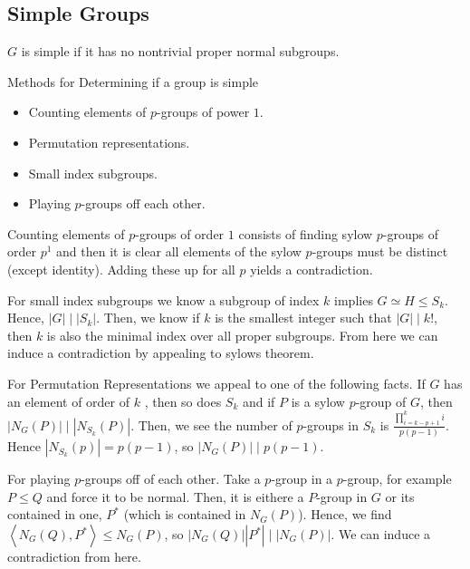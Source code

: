 \subsection{Simple Groups}
\begin{definition}
\(G\) is simple if it has no nontrivial proper normal subgroups.
\end{definition}
\begin{remark}
	Methods for Determining if a group is simple
	\begin{itemize}
		\item Counting elements of \(p\)-groups of power \(1\).
			\item Permutation representations.
				\item Small index subgroups.
					\item Playing \(p\)-groups off each other.
	\end{itemize}
\end{remark}
\begin{remark}
	Counting elements of \(p\)-groups of order \(1\) consists of finding sylow \(p\)-groups of order \(p^{1}\) and then it is clear all elements of the sylow \(p\)-groups must be distinct (except identity). Adding these up for all \(p\) yields a contradiction.
\end{remark}
\begin{remark}
	For small index subgroups we know a subgroup of index \(k\) implies \(G \simeq H \le S_{k}\). Hence, \(\left| G \right| \mid \left| S_{k} \right| \). Then, we know if \(k\) is the smallest integer such that \(\left| G \right| \mid k!\), then \(k\) is also the minimal index over all proper subgroups. From here we can induce a contradiction by appealing to sylows theorem.
\end{remark}
\begin{remark}
	For Permutation Representations we appeal to one of the following facts. If \(G\) has an element of order of \(k\) , then so does \(S_{k}\)  and if \(P\) is a sylow \(p\)-group of \(G\), then \(\left| N_{G}\left( P \right)  \right| \mid \left| N_{S_{k}}\left( P \right)  \right|  \). Then, we see the number of \(p\)-groups in \(S_{k}\) is \(\frac{\prod_{i=k-p+1}^{k} i}{p\left( p-1 \right) } \). Hence \(\left|N_{S_{k}}\left( p \right) \right| = p\left( p-1 \right)  \), so \(\left|N_{G}\left( P \right) \right| \mid p\left( p-1 \right) \).
\end{remark}
\begin{remark}
	For playing \(p\)-groups off of each other. Take a \(p\)-group in a \(p\)-group, for example \(P \le Q\) and force it to be normal. Then, it is eithere a \(P\)-group in \(G\) or its contained in one, \(P^{*}\)  (which is contained in \(N_{G}\left( P \right) \)). Hence, we  find \(\left<N_{G}(Q), P^{*} \right> \le N_{G}\left( P \right)  \), so \(\left| N_{G}\left( Q \right)  \right| \left| P^{*} \right|  \mid \left| N_{G}\left( P \right)  \right|  \). We can induce a contradiction from here.
\end{remark}

